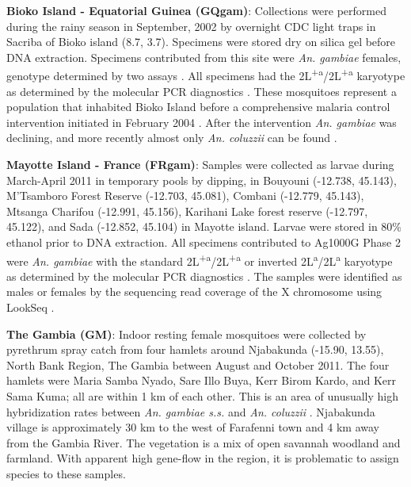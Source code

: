 \documentclass[a4paper,11pt,abstracton,hidelinks]{scrartcl}
\begin{document}
\textbf{Bioko Island - Equatorial Guinea (GQgam)}: Collections were performed during the rainy season in September, 2002 by overnight CDC light traps in Sacriba of Bioko island (8.7, 3.7).
%
Specimens were stored dry on silica gel before DNA extraction.
%
Specimens contributed from this site were \textit{An. gambiae} females, genotype determined by two assays \cite{Scott1993, Santolamazza2004}.
%
All specimens had the 2L\textsuperscript{+a}/2L\textsuperscript{+a} karyotype as determined by the molecular PCR diagnostics \cite{White2007}. 
%
These mosquitoes represent a population that inhabited Bioko Island before a comprehensive malaria control intervention initiated in February 2004 \cite{Sharp2007}. 
%
After the intervention \textit{An. gambiae} was declining, and more recently almost only \textit{An. coluzzii} can be found \cite{Overgaard2012}.

%
\textbf{Mayotte Island - France (FRgam)}: Samples were collected as larvae during March-April 2011 in temporary pools by dipping, in Bouyouni (-12.738, 45.143), M'Tsamboro Forest Reserve (-12.703, 45.081), Combani (-12.779, 45.143), Mtsanga Charifou (-12.991, 45.156), Karihani Lake forest reserve (-12.797, 45.122), and Sada (-12.852, 45.104) in Mayotte island.
%
Larvae were stored in 80\% ethanol prior to DNA extraction. 
%
All specimens contributed to Ag1000G Phase 2 were \textit{An. gambiae} \cite{Santolamazza2004} with the standard 2L\textsuperscript{+a}/2L\textsuperscript{+a} or inverted 2L\textsuperscript{a}/2L\textsuperscript{a} karyotype as determined by the molecular PCR diagnostics \cite{White2007}.
%
The samples were identified as males or females by the sequencing read coverage of the X chromosome using LookSeq \cite{Manske2009}.

%
\textbf{The Gambia (GM)}: Indoor resting female mosquitoes were collected by pyrethrum spray catch from four hamlets around Njabakunda (-15.90, 13.55), North Bank Region, The Gambia between August and October 2011.
%
The four hamlets were Maria Samba Nyado, Sare Illo Buya, Kerr Birom Kardo, and Kerr Sama Kuma; all are within 1 km of each other.
%
This is an area of unusually high hybridization rates between \textit{An. gambiae s.s.} and \textit{An. coluzzii} \cite{Caputo2008, Nwakanma2013}.
%
Njabakunda village is approximately 30 km to the west of Farafenni town and 4 km away from the Gambia River.
%
The vegetation is a mix of open savannah woodland and farmland.
%
With apparent high gene-flow in the region, it is problematic to assign species to these samples.
\end{document}
